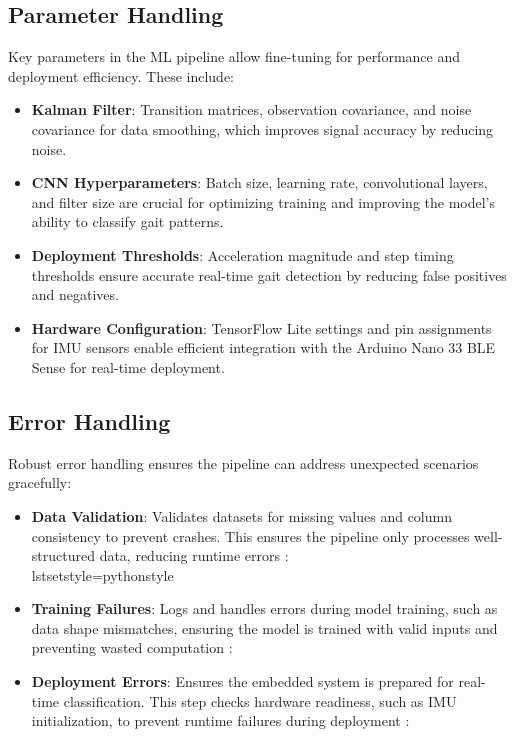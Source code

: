 \subsection{Parameter Handling}
Key parameters in the ML pipeline allow fine-tuning for performance and deployment efficiency. These include:
\begin{itemize}
    \item \textbf{Kalman Filter}: Transition matrices, observation covariance, and noise covariance for data smoothing, which improves signal accuracy by reducing noise\cite{Kalman:2012}.
    \item \textbf{CNN Hyperparameters}: Batch size, learning rate, convolutional layers, and filter size are crucial for optimizing training and improving the model's ability to classify gait patterns\cite{Goodfellow:2016}.
    \item \textbf{Deployment Thresholds}: Acceleration magnitude and step timing thresholds ensure accurate real-time gait detection by reducing false positives and negatives\cite{Zhang:2022}.
    \item \textbf{Hardware Configuration}: TensorFlow Lite settings and pin assignments for IMU sensors enable efficient integration with the Arduino Nano 33 BLE Sense for real-time deployment\cite{ArduinoNano33Sense2025}.
\end{itemize}

\subsection{Error Handling}
Robust error handling ensures the pipeline can address unexpected scenarios gracefully:
\begin{itemize}
    \item \textbf{Data Validation}: Validates datasets for missing values and column consistency to prevent crashes. This ensures the pipeline only processes well-structured data, reducing runtime errors \cite{Pandas:2024}:
    \\lstset{style=pythonstyle}


    \item \textbf{Training Failures}: Logs and handles errors during model training, such as data shape mismatches, ensuring the model is trained with valid inputs and preventing wasted computation \cite{TensorFlow:2024}:
      


    \item \textbf{Deployment Errors}: Ensures the embedded system is prepared for real-time classification. This step checks hardware readiness, such as IMU initialization, to prevent runtime failures during deployment \cite{ArduinoNano33Sense2025}:
   
\end{itemize}

